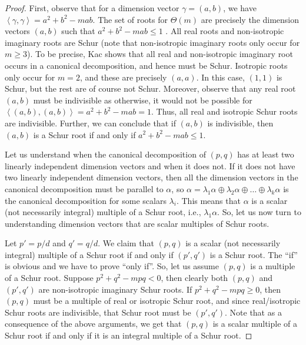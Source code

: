 \documentclass[11pt]{amsart}
\theoremstyle{definition}
\begin{document}
\begin{proof}

First, observe that for a dimension vector $\gamma = (a,b)$, we have $\left< \gamma,\gamma \right> = a^2 + b^2 - mab$. The set of roots for $\Theta(m)$ are precisely the dimension vectors $(a,b)$ such that $a^2 + b^2 - mab \leq 1$ \cite{Kac}. All real roots and non-isotropic imaginary roots are Schur \cite[Theorem~4]{Kac} (note that non-isotropic imaginary roots only occur for $m \geq 3$). To be precise, Kac shows that all real and non-isotropic imaginary root occurs in a canonical decomposition, and hence must be Schur. Isotropic roots only occur for $m = 2$, and these are precisely $(a,a)$. In this case, $(1,1)$ is Schur, but the rest are of course not Schur. Moreover, observe that any real root $(a,b)$ must be indivisible as otherwise, it would not be possible for $\left<(a,b),(a,b)\right>  = a^2 + b^2 - mab = 1$. Thus, all real and isotropic Schur roots are indivisible. Further, we can conclude that if $(a,b)$ is indivisible, then $(a,b)$ is a Schur root if and only if $a^2 + b^2 - mab \leq 1$.


Let us understand when the canonical decomposition of $(p,q)$ has at least two linearly independent dimension vectors and when it does not. If it does not have two linearly independent dimension vectors, then all the dimension vectors in the canonical decomposition must be parallel to $\alpha$, so $\alpha = \lambda_1 \alpha \oplus \lambda_2 \alpha \oplus \dots \oplus \lambda_k \alpha$ is the canonical decomposition for some scalars $\lambda_i$. This means that $\alpha$ is a scalar (not necessarily integral) multiple of a Schur root, i.e., $\lambda_1 \alpha$. So, let us now turn to understanding dimension vectors that are scalar multiples of Schur roots.


Let $p' = p/d$ and $q' = q/d$. We claim that $(p,q)$ is a  scalar (not necessarily integral) multiple of a Schur root if and only if $(p',q')$ is a Schur root. The ``if'' is obvious and we have to prove ``only if''. So, let us assume $(p,q)$ is a multiple of a Schur root. Suppose $p^2 + q^2 - mpq < 0$, then clearly both $(p,q)$ and $(p',q')$ are non-isotropic imaginary Schur roots. If $p^2 + q^2 - mpq \geq 0$, then $(p,q)$ must be a multiple of real or isotropic Schur root, and since real/isotropic Schur roots are indivisible, that Schur root must be $(p',q')$. Note that as a consequence of the above arguments, we get that $(p,q)$ is a scalar multiple of a Schur root if and only if it is an integral multiple of a Schur root.




\end{proof}
\end{document}
